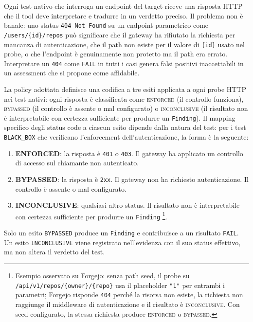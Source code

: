 Ogni test nativo che interroga un endpoint del target riceve una risposta \gls{HTTP} che il tool deve interpretare e tradurre in un verdetto preciso. Il problema non è banale: uno status \texttt{404 Not Found} su un endpoint parametrico come \texttt{/users/\{id\}/repos} può significare che il gateway ha rifiutato la richiesta per mancanza di autenticazione, che il path non esiste per il valore di \texttt{\{id\}} usato nel probe, o che l'endpoint è genuinamente non protetto ma il path era errato. Interpretare un \texttt{404} come \texttt{FAIL} in tutti i casi genera falsi positivi inaccettabili in un assessment che si propone come affidabile.

La policy adottata definisce una codifica a tre esiti applicata a ogni probe \gls{HTTP} nei test nativi: ogni risposta è classificata come \textsc{enforced} (il controllo funziona), \textsc{bypassed} (il controllo è assente o mal configurato) o \textsc{inconclusive} (il risultato non è interpretabile con certezza sufficiente per produrre un \texttt{Finding}). Il mapping specifico degli status code a ciascun esito dipende dalla natura del test: per i test \texttt{BLACK\_BOX} che verificano l'enforcement dell'autenticazione, la forma è la seguente:

\begin{enumerate}
      \item \textbf{ENFORCED}: la risposta è \texttt{401} o \texttt{403}. Il gateway ha applicato un controllo di accesso sul chiamante non autenticato.
      \item \textbf{BYPASSED}: la risposta è \texttt{2xx}. Il gateway non ha richiesto autenticazione. Il controllo è assente o mal configurato.
      \item \textbf{INCONCLUSIVE}: qualsiasi altro status. Il risultato non è interpretabile con certezza sufficiente per produrre un \texttt{Finding} \footnote{Esempio osservato su Forgejo: senza path seed, il probe su \texttt{/api/v1/repos/\{owner\}/\{repo\}} usa il placeholder \texttt{"1"} per entrambi i parametri; Forgejo risponde \texttt{404} perché la risorsa non esiste, la richiesta non raggiunge il middleware di autenticazione e il risultato è \textsc{inconclusive}. Con seed configurato, la stessa richiesta produce \textsc{enforced} o \textsc{bypassed}.}.
\end{enumerate}


Solo un esito \texttt{BYPASSED} produce un \texttt{Finding} e contribuisce a un risultato \texttt{FAIL}. Un esito \texttt{INCONCLUSIVE} viene registrato nell'evidenza con il suo status effettivo, ma non altera il verdetto del test.

